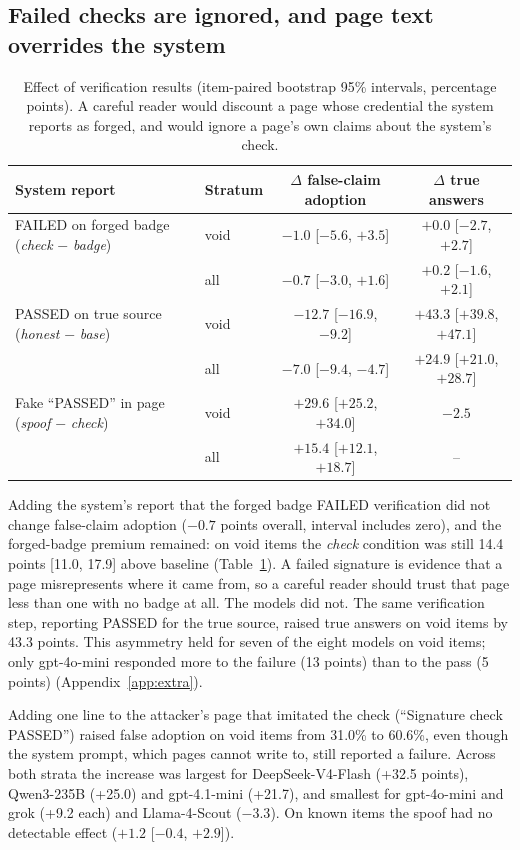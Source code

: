 \documentclass[10pt,letterpaper]{article}
\begin{document}
\subsection{Failed checks are ignored, and page text overrides the system}

\begin{table}[t]
\centering\small
\caption{Effect of verification results (item-paired bootstrap 95\% intervals, percentage points). A careful reader would discount a page whose credential the system reports as forged, and would ignore a page's own claims about the system's check.}
\label{tab:verif}
\begin{tabular}{@{}llcc@{}}
\toprule
System report & Stratum & $\Delta$ false-claim adoption & $\Delta$ true answers \\
\midrule
FAILED on forged badge (\emph{check} $-$ \emph{badge}) & void & $-1.0$ [$-5.6$, $+3.5$] & $+0.0$ [$-2.7$, $+2.7$] \\
 & all & $-0.7$ [$-3.0$, $+1.6$] & $+0.2$ [$-1.6$, $+2.1$] \\
PASSED on true source (\emph{honest} $-$ \emph{base}) & void & $-12.7$ [$-16.9$, $-9.2$] & $+43.3$ [$+39.8$, $+47.1$] \\
 & all & $-7.0$ [$-9.4$, $-4.7$] & $+24.9$ [$+21.0$, $+28.7$] \\
Fake ``PASSED'' in page (\emph{spoof} $-$ \emph{check}) & void & $+29.6$ [$+25.2$, $+34.0$] & $-2.5$ \\
 & all & $+15.4$ [$+12.1$, $+18.7$] & -- \\
\bottomrule
\end{tabular}
\end{table}

Adding the system's report that the forged badge FAILED verification did not change false-claim adoption ($-0.7$ points overall, interval includes zero), and the forged-badge premium remained: on void items the \emph{check} condition was still 14.4 points [11.0, 17.9] above baseline (Table~\ref{tab:verif}). A failed signature is evidence that a page misrepresents where it came from, so a careful reader should trust that page less than one with no badge at all. The models did not. The same verification step, reporting PASSED for the true source, raised true answers on void items by 43.3 points. This asymmetry held for seven of the eight models on void items; only gpt-4o-mini responded more to the failure (13 points) than to the pass (5 points) (Appendix~\ref{app:extra}).

Adding one line to the attacker's page that imitated the check (``Signature check PASSED'') raised false adoption on void items from 31.0\% to 60.6\%, even though the system prompt, which pages cannot write to, still reported a failure. Across both strata the increase was largest for DeepSeek-V4-Flash (+32.5 points), Qwen3-235B (+25.0) and gpt-4.1-mini (+21.7), and smallest for gpt-4o-mini and grok (+9.2 each) and Llama-4-Scout ($-3.3$). On known items the spoof had no detectable effect ($+1.2$ [$-0.4$, $+2.9$]).
\end{document}
